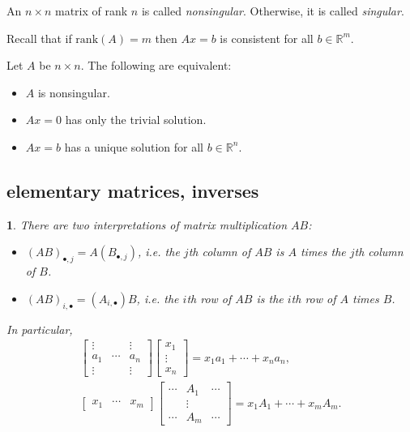 \documentclass[12pt]{article}
\newtheorem{para}[theorem]{}
\begin{document}
\begin{definition}
	An $n\times n$ matrix of rank $n$ is called \emph{nonsingular}. Otherwise, it is called \emph{singular}.
\end{definition}

Recall that if $\text{rank}(A)=m$ then $Ax=b$ is consistent for all $b\in\mathbb{R}^m$.

\begin{theorem}
	Let $A$ be $n\times n$. The following are equivalent:
	\begin{itemize}
		\item $A$ is nonsingular.
		\item $Ax=0$ has only the trivial solution.
		\item $Ax=b$ has a unique solution for all $b\in\mathbb{R}^n$.
	\end{itemize}
\end{theorem}


\subsection{elementary matrices, inverses} %

\begin{para} 
	There are two interpretations of matrix multiplication $AB$:
	\begin{itemize}
		\item $(AB)_{\bullet, j} = A(B_{\bullet, j})$, i.e. the $j$th column of $AB$ is $A$ times the $j$th column of $B$.
		\item $(AB)_{i,\bullet}=(A_{i,\bullet})B$, i.e. the $i$th row of $AB$ is the $i$th row of $A$ times $B$.
	\end{itemize}
	In particular, 
	\begin{gather*}
		\begin{bmatrix} \vdots & & \vdots \\ a_1 & \cdots & a_n \\ \vdots & & \vdots \end{bmatrix} \begin{bmatrix} x_1 \\ \vdots \\ x_n \end{bmatrix} = x_1a_1 + \cdots + x_n a_n, \\
		\begin{bmatrix} x_1 & \cdots & x_m \end{bmatrix} \begin{bmatrix} \cdots & A_1 & \cdots \\ & \vdots & \\ \cdots & A_m & \cdots \end{bmatrix} = x_1A_1 + \cdots + x_mA_m.
	\end{gather*}
\end{para}	
\end{document}
